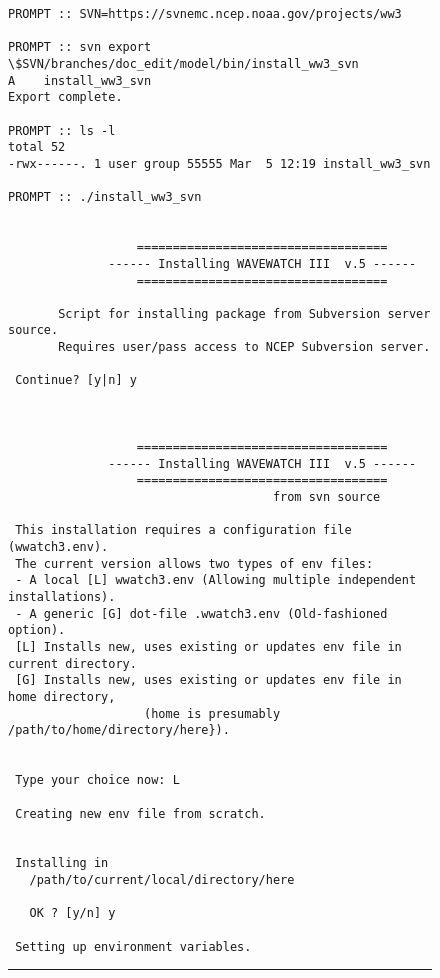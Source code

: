 \documentclass[12pt]{article}
\newcommand{\botline}{\vspace{1 mm}\rule{152mm}{0.5mm}}
\newcounter{myfigno}[section]
\newenvironment{myfig}[1]{\begin{figure}[#1]
                         \refstepcounter{myfigno}}                       
                        {\end{figure}}
\begin{document}
\begin{myfig}{tbp}
\begin{minipage}[c]{4.5in}
{\scriptsize \begin{verbatim}
PROMPT :: SVN=https://svnemc.ncep.noaa.gov/projects/ww3

PROMPT :: svn export \$SVN/branches/doc_edit/model/bin/install_ww3_svn
A    install_ww3_svn
Export complete.

PROMPT :: ls -l
total 52
-rwx------. 1 user group 55555 Mar  5 12:19 install_ww3_svn

PROMPT :: ./install_ww3_svn


                  ===================================
              ------ Installing WAVEWATCH III  v.5 ------
                  =================================== 

       Script for installing package from Subversion server source. 
       Requires user/pass access to NCEP Subversion server. 

 Continue? [y|n] y



                  ===================================
              ------ Installing WAVEWATCH III  v.5 ------
                  ===================================
                                     from svn source 

 This installation requires a configuration file (wwatch3.env).
 The current version allows two types of env files: 
 - A local [L] wwatch3.env (Allowing multiple independent installations).
 - A generic [G] dot-file .wwatch3.env (Old-fashioned option).
 [L] Installs new, uses existing or updates env file in current directory.
 [G] Installs new, uses existing or updates env file in home directory, 
                   (home is presumably /path/to/home/directory/here}).

 
 Type your choice now: L

 Creating new env file from scratch.


 Installing in 
   /path/to/current/local/directory/here

   OK ? [y/n] y

 Setting up environment variables. 

\end{verbatim}}
\end{minipage}
\botline
\end{myfig}
\end{document}
